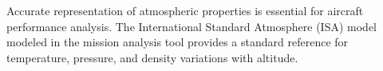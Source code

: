 Accurate representation of atmospheric properties is essential for aircraft performance analysis. The International Standard Atmosphere (ISA) model modeled in the mission analysis tool provides a standard reference for temperature, pressure, and density variations with altitude.